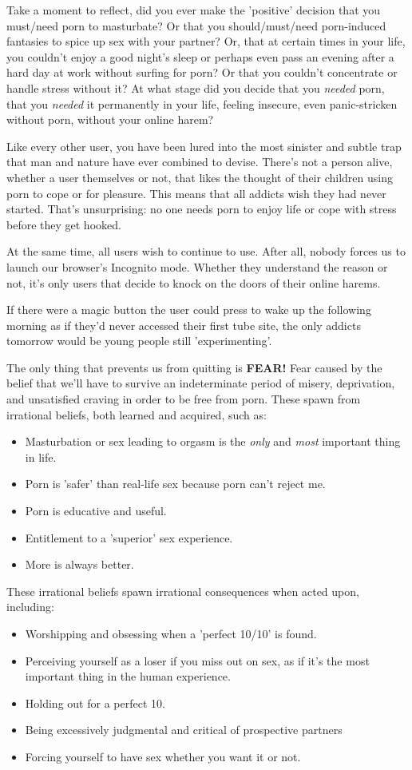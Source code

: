 \documentclass[easypeasy.tex]{subfiles}
\begin{document}
Take a moment to reflect, did you ever make the 'positive' decision that you must/need porn to masturbate? Or that you should/must/need porn-induced fantasies to spice up sex with your partner? Or, that at certain times in your life, you couldn't enjoy a good night's sleep or perhaps even pass an evening after a hard day at work without surfing for porn? Or that you couldn't concentrate or handle stress without it? At what stage did you decide that you \textit{needed} porn, that you \textit{needed} it permanently in your life, feeling insecure, even panic-stricken without porn, without your online harem?

Like every other user, you have been lured into the most sinister and subtle trap that man and nature have ever combined to devise. There's not a person alive, whether a user themselves or not, that likes the thought of their children using porn to cope or for pleasure. This means that all addicts wish they had never started. That's unsurprising: no one needs porn to enjoy life or cope with stress before they get hooked.

At the same time, all users wish to continue to use. After all, nobody forces us to launch our browser's Incognito mode. Whether they understand the reason or not, it's only users that decide to knock on the doors of their online harems.

If there were a magic button the user could press to wake up the following morning as if they'd never accessed their first tube site, the only addicts tomorrow would be young people still 'experimenting'.

The only thing that prevents us from quitting is \textbf{FEAR!} Fear caused by the belief that we'll have to survive an indeterminate period of misery, deprivation, and unsatisfied craving in order to be free from porn. These spawn from irrational beliefs, both learned and acquired, such as:
    \begin{itemize}
      \item Masturbation or sex leading to orgasm is the \textit{only} and \textit{most} important thing in life.
      \item Porn is 'safer' than real-life sex because porn can't reject me.
      \item Porn is educative and useful.
      \item Entitlement to a 'superior' sex experience.
      \item More is always better.
    \end{itemize}
These irrational beliefs spawn irrational consequences when acted upon, including:
  \begin{itemize}
    \item Worshipping and obsessing when a 'perfect 10/10' is found.
    \item Perceiving yourself as a loser if you miss out on sex, as if it's the most important thing in the human experience.
    \item Holding out for a perfect 10.
    \item Being excessively judgmental and critical of prospective partners
    \item Forcing yourself to have sex whether you want it or not.
  \end{itemize}
\end{document}
